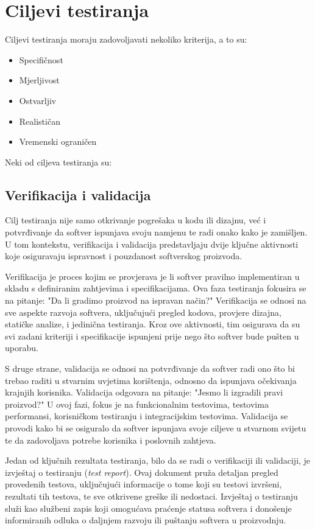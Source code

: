 \section{Ciljevi testiranja}
Ciljevi testiranja moraju zadovoljavati nekoliko kriterija, a to su:
\begin{itemize}
\item Specifičnost
\item Mjerljivost
\item Ostvarljiv
\item Realističan
\item Vremenski ograničen
\end{itemize}

Neki od ciljeva testiranja su: \cite{quadri2010software}
\subsection*{Verifikacija i validacija}
Cilj testiranja nije samo otkrivanje pogrešaka u kodu ili dizajnu, već i potvrđivanje da softver ispunjava svoju namjenu te radi onako kako je zamišljen.
U tom kontekstu, verifikacija i validacija predstavljaju dvije ključne aktivnosti koje osiguravaju ispravnost i pouzdanost softverskog proizvoda.

Verifikacija je proces kojim se provjerava je li softver pravilno implementiran u skladu s definiranim zahtjevima i specifikacijama.
Ova faza testiranja fokusira se na pitanje: "Da li gradimo proizvod na ispravan način?" Verifikacija se odnosi na sve aspekte razvoja softvera, uključujući pregled kodova, provjere dizajna, statičke analize, i jedinična testiranja.
Kroz ove aktivnosti, tim osigurava da su svi zadani kriteriji i specifikacije ispunjeni prije nego što softver bude pušten u uporabu.

S druge strane, validacija se odnosi na potvrđivanje da softver radi ono što bi trebao raditi u stvarnim uvjetima korištenja, odnosno da ispunjava očekivanja krajnjih korisnika.
Validacija odgovara na pitanje: "Jesmo li izgradili pravi proizvod?" U ovoj fazi, fokus je na funkcionalnim testovima, testovima performansi, korisničkom testiranju i integracijskim testovima.
Validacija se provodi kako bi se osiguralo da softver ispunjava svoje ciljeve u stvarnom svijetu te da zadovoljava potrebe korisnika i poslovnih zahtjeva.

Jedan od ključnih rezultata testiranja, bilo da se radi o verifikaciji ili validaciji, je izvještaj o testiranju (\textit{test report}).
Ovaj dokument pruža detaljan pregled provedenih testova, uključujući informacije o tome koji su testovi izvršeni, rezultati tih testova, te sve otkrivene greške ili nedostaci.
Izvještaj o testiranju služi kao službeni zapis koji omogućava praćenje statusa softvera i donošenje informiranih odluka o daljnjem razvoju ili puštanju softvera u proizvodnju.

